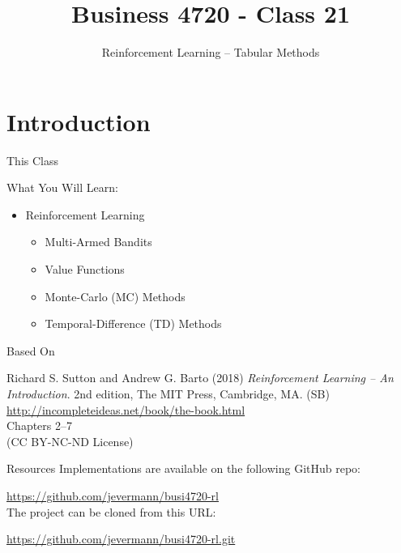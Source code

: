 \documentclass[ignorenonframetext,xcolor=x11names]{beamer}
\title{Business 4720 - Class 21}
\subtitle{Reinforcement Learning -- Tabular Methods}
\begin{document}
\begin{frame}{}
  \titlepage
  \footnotesize
  
\end{frame}

\section{Introduction}

\begin{frame}{This Class}

\begin{block}{What You Will Learn:}
\begin{itemize}
  \item Reinforcement Learning
  \begin{itemize}
     \item Multi-Armed Bandits
     \item Value Functions
     \item Monte-Carlo (MC) Methods
     \item Temporal-Difference (TD) Methods
  \end{itemize}
\end{itemize}
\end{block}
\end{frame}

\begin{frame}{Based On}
\begin{block}{}
Richard S. Sutton and Andrew G. Barto (2018) \emph{Reinforcement Learning -- An Introduction}. 2nd edition, The MIT Press, Cambridge, MA. (SB) \\
\vspace{0.5\baselineskip}
\url{http://incompleteideas.net/book/the-book.html} \\
\vspace{0.5\baselineskip}
Chapters 2--7 \\
\vspace{0.5\baselineskip}
(CC BY-NC-ND License)
\end{block}
\end{frame}

\begin{frame}{Resources}
Implementations are available on the following GitHub repo:

\url{https://github.com/jevermann/busi4720-rl} \\


The project can be cloned from this URL:

\url{https://github.com/jevermann/busi4720-rl.git}
\end{frame}
\end{document}
